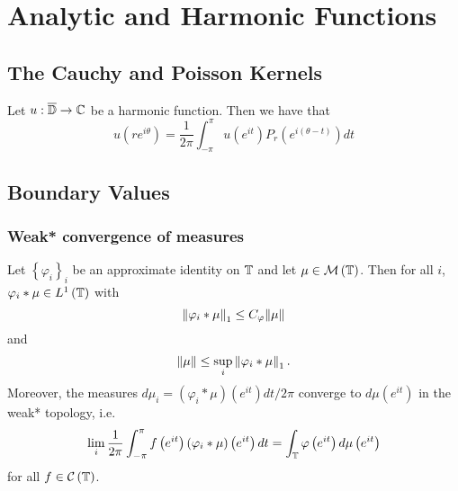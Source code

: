 \chapter{Analytic and Harmonic Functions}
\section{The Cauchy and Poisson Kernels}
\begin{proposition}
    Let $u: \overline{\mathbb D} \to \mathbb C$ be a harmonic function. Then we have that
    \begin{equation}
	u\left( re^{i\theta} \right) = \frac{1}{2\pi} \int_{-\pi}^{\pi} u\left( e^{it} \right) P_{r} \left( e^{i\left( \theta -t \right)} \right) dt
    \end{equation}
    \label{prop:poisson-integral-formula-for-harmonic-function}
\end{proposition}

\section{Boundary Values}
\subsection{Weak* convergence of measures}
\begin{theorem}
    Let $\left\{ \varphi _{i} \right\}_{i}$ be an approximate identity on $\mathbb T$ and let $\mu \in {\cal M} \left( \mathbb T \right)$. Then for all $i$, $\varphi_{i} * \mu  \in L^{1} \left( \mathbb T \right)$ with
    \begin{equation*}
	\left\lVert \varphi _{i} * \mu \right\rVert_{1} \le C_{\varphi} \lVert \mu \rVert
    \end{equation*}
    and
    \begin{equation*}
	\left\lVert \mu \right\rVert \le \sup_{i} \left\lVert \varphi_{i} * \mu \right\rVert_{1}\text{.}
    \end{equation*}
    Moreover, the measures $d\mu_{i} = \left( \varphi_{i} * \mu \right) \left( e^{it} \right) dt/2\pi$ converge to $d\mu \left( e^{it} \right)$ in the weak* topology, i.e.
    \begin{equation*}
	\lim_{i} \frac{1}{2\pi} \int_{-\pi}^{\pi} f\left( e^{it} \right) \left( \varphi_{i} * \mu \right) \left( e^{it} \right) dt = \int_{\mathbb T} \varphi\left( e^{it} \right) d\mu \left( e^{it} \right)
    \end{equation*}
    for all $f \in {\cal C} \left( \mathbb T \right)$.
    \label{thm:weak-star-measures}
\end{theorem}

